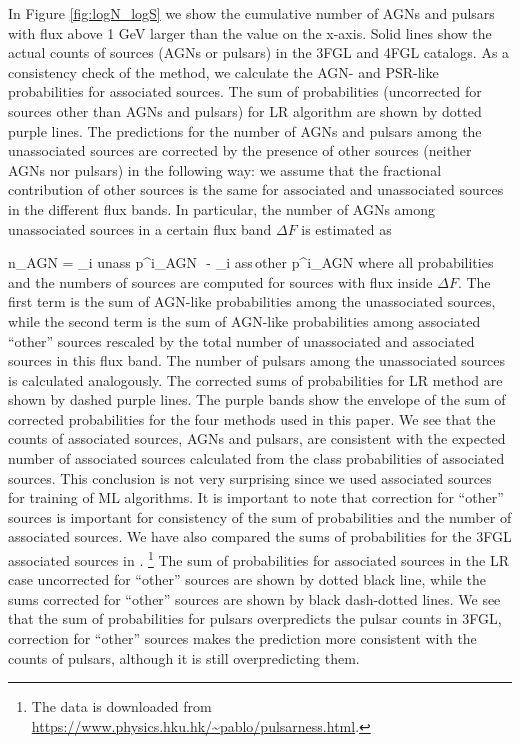 In Figure \ref{fig:logN_logS} we show the cumulative number of AGNs and pulsars with flux above 1 GeV larger than the
value on the x-axis.
Solid lines show the actual counts of sources (AGNs or pulsars) in the 3FGL and 4FGL catalogs.
As a consistency check of the method, we calculate the AGN- and PSR-like probabilities for associated sources.
The sum of probabilities (uncorrected for sources other than AGNs and pulsars) for LR algorithm are shown by dotted purple lines.
The predictions for the number of AGNs and pulsars among the unassociated sources are corrected by the presence of other sources (neither AGNs nor pulsars) in the following way:
we assume that the fractional contribution of other sources is the same for associated and unassociated sources in the different flux bands.
In particular, the number of AGNs among unassociated sources in a certain flux band $\Delta F$ is estimated as

\be
{}
n_{\rm AGN} = \sum_{i \in \rm unass} p^i_{\rm AGN}\,\, - \sum_{i \in \rm ass\,other} p^i_{\rm AGN} \cdot 
{}
\ee
where all probabilities and the numbers of sources are computed for sources with flux inside $\Delta F$.
The first term is the sum of AGN-like probabilities among the unassociated sources,
while the second term is the sum of AGN-like probabilities among associated ``other'' sources rescaled by the total number
of unassociated and associated sources in this flux band.
The number of pulsars among the unassociated sources is calculated analogously.
The corrected sums of probabilities for LR method are shown by dashed purple lines.
The purple bands show the envelope of the sum of corrected probabilities for the four methods used in this paper.
We see that the counts of associated sources, AGNs and pulsars, are consistent with the expected number of associated sources
calculated from the class probabilities of associated sources.
This conclusion is not very surprising since we used associated sources for training of ML algorithms.
It is important to note that correction for ``other'' sources is important for consistency of the sum of probabilities and the number of associated sources.
We have also compared the sums of probabilities for the 3FGL associated sources in \cite{2016ApJ...820....8S}.%
\footnote{The data is downloaded from \url{https://www.physics.hku.hk/~pablo/pulsarness.html}.}
The sum of probabilities for associated sources in the LR case uncorrected for ``other'' sources are shown by dotted black line,
while the sums corrected for ``other'' sources are shown by black dash-dotted lines.
We see that the sum of probabilities for pulsars overpredicts the pulsar counts in 3FGL, correction for ``other'' sources makes the prediction 
more consistent with the counts of pulsars, although it is still overpredicting them.

